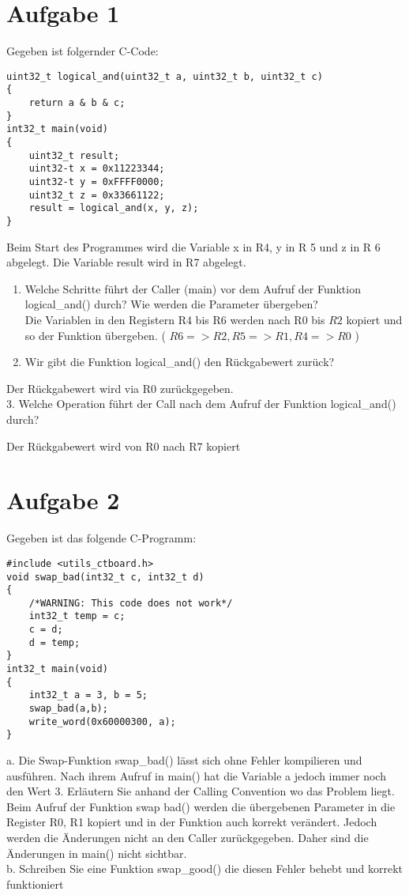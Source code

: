 \section*{Aufgabe 1}
Gegeben ist folgernder C-Code:

\begin{verbatim}
uint32_t logical_and(uint32_t a, uint32_t b, uint32_t c)
{
    return a & b & c;
}
int32_t main(void)
{
    uint32_t result;
    uint32-t x = 0x11223344;
    uint32-t y = 0xFFFF0000;
    uint32_t z = 0x33661122;
    result = logical_and(x, y, z);
}
\end{verbatim}

Beim Start des Programmes wird die Variable x in R4, y in R 5 und z in R 6 abgelegt. Die Variable result wird in R7 abgelegt.

\begin{enumerate}
  \item Welche Schritte führt der Caller (main) vor dem Aufruf der Funktion logical\_and() durch? Wie werden die Parameter übergeben?\\
Die Variablen in den Registern R4 bis R6 werden nach R0 bis $R 2$ kopiert und so der Funktion übergeben. ( $R 6=>R 2, R 5=>R 1, R 4=>R 0$ )\\
$\qquad$
  \item Wir gibt die Funktion logical\_and() den Rückgabewert zurück?
\end{enumerate}

Der Rückgabewert wird via R0 zurückgegeben.\\
3. Welche Operation führt der Call nach dem Aufruf der Funktion logical\_and() durch?

Der Rückgabewert wird von R0 nach R7 kopiert

\section*{Aufgabe 2}
Gegeben ist das folgende C-Programm:

\begin{verbatim}
#include <utils_ctboard.h>
void swap_bad(int32_t c, int32_t d)
{
    /*WARNING: This code does not work*/
    int32_t temp = c;
    c = d;
    d = temp;
}
int32_t main(void)
{
    int32_t a = 3, b = 5;
    swap_bad(a,b);
    write_word(0x60000300, a);
}
\end{verbatim}

a. Die Swap-Funktion swap\_bad() lässt sich ohne Fehler kompilieren und ausführen. Nach ihrem Aufruf in main() hat die Variable a jedoch immer noch den Wert 3. Erläutern Sie anhand der Calling Convention wo das Problem liegt.\\
Beim Aufruf der Funktion swap bad() werden die übergebenen Parameter in die Register R0, R1 kopiert und in der Funktion auch korrekt verändert. Jedoch werden die Änderungen nicht an den Caller zurückgegeben. Daher sind die Änderungen in main() nicht sichtbar.\\
b. Schreiben Sie eine Funktion swap\_good() die diesen Fehler behebt und korrekt funktioniert

